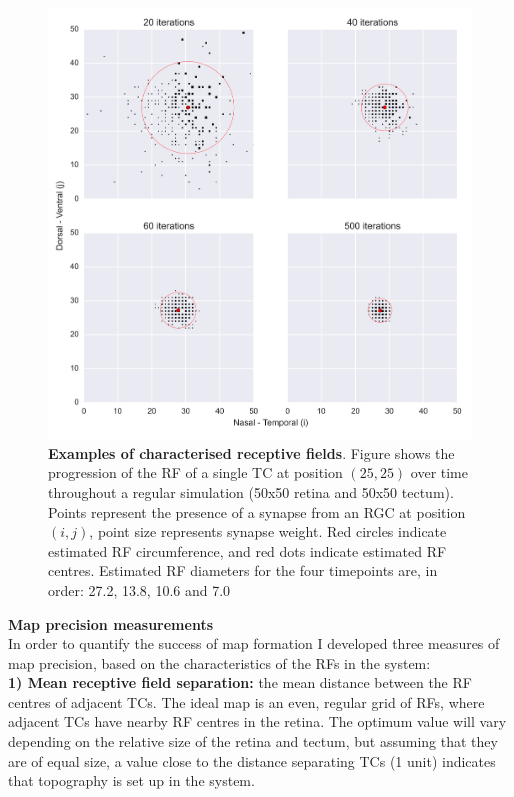 \documentclass[11pt]{"article"}
\begin{document}
\begin{figure}[!h]
\includegraphics[scale=0.8]{AreaPlot}
\caption{\textbf{Examples of characterised receptive fields}. 
Figure shows the progression of the RF of a single TC at position $(25,25)$ over time throughout a regular simulation (50x50 retina and 50x50 tectum).
Points represent the presence of a synapse from an RGC at position $(i,j)$, point size represents synapse weight. Red circles indicate estimated RF circumference, and red dots indicate estimated RF centres. Estimated RF diameters for the four timepoints are, in order: 27.2, 13.8, 10.6 and 7.0}
\label{fig:AreaPlot}
\end{figure}

\pagebreak

\textbf{Map precision measurements}\\
In order to quantify the success of map formation I developed three measures of map precision, based on the characteristics of the RFs in the system:\\

\textbf{1) Mean receptive field separation:} the mean distance between the RF centres of adjacent TCs. The ideal map is an even, regular grid of RFs, where adjacent TCs have nearby RF centres in the retina. The optimum value will vary depending on the relative size of the retina and tectum, but assuming that they are of equal size, a value close to the distance separating TCs (1 unit) indicates that topography is set up in the system.
\\
\end{document}
